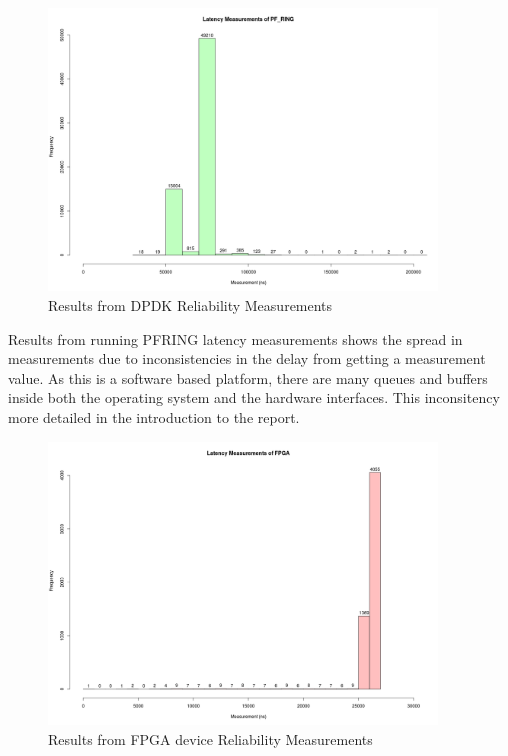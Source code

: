 \begin{figure}[H]
    \begin{center}
        \includegraphics[keepaspectratio,height=7.5cm]{Images/pf_ring}
        \caption{Results from DPDK Reliability Measurements}
        \label{fig:DPDKReliability}
    \end{center}
\end{figure}

Results from running PF\textunderscore RING latency measurements shows the spread in measurements due to 
inconsistencies in the delay from getting a measurement value. As this is a software based platform, there are many 
queues and buffers inside both the operating system and the hardware interfaces. This inconsitency more detailed in 
the introduction to the report.

\begin{figure}[H]
    \begin{center}
        \includegraphics[keepaspectratio,height=7.5cm]{Images/TestPlot}
        \caption{Results from FPGA device Reliability Measurements}
        \label{fig:Test2Plot}
    \end{center}
\end{figure}

